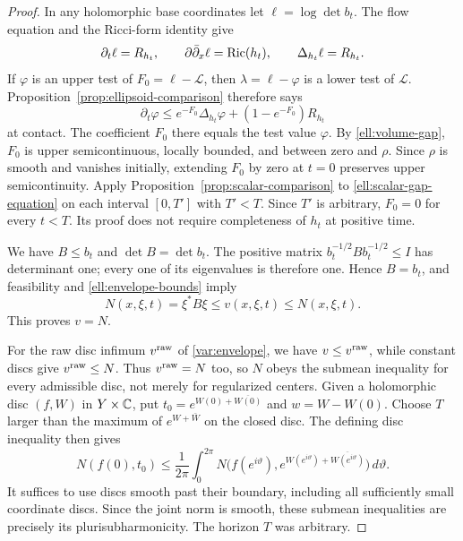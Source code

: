 \begin{proof}
In any holomorphic base coordinates let $\ell=\log\det b_t$.
The flow equation and the Ricci-form identity give
\[
 \partial_t\ell=R_{h_t},\qquad
 \partial\bar\partial_x\ell=\operatorname{Ric}(h_t),\qquad
 \Delta_{h_t}\ell=R_{h_t}.
\]
If $\varphi$ is an upper test of $F_0=\ell-\mathcal L$, then
$\lambda=\ell-\varphi$ is a lower test of $\mathcal L$.
Proposition~\ref{prop:ellipsoid-comparison} therefore says
\begin{equation}\label{ell:scalar-gap-equation}
 \partial_t\varphi
 \le e^{-F_0}\Delta_{h_t}\varphi
          +(1-e^{-F_0})R_{h_t}
\end{equation}
at contact.  The coefficient $F_0$ there equals the test value
$\varphi$.  By \eqref{ell:volume-gap}, $F_0$ is upper semicontinuous,
locally bounded, and between zero and $\rho$.  Since $\rho$ is smooth
and vanishes initially, extending $F_0$ by zero at $t=0$ preserves
upper semicontinuity.  Apply Proposition~\ref{prop:scalar-comparison}
to \eqref{ell:scalar-gap-equation} on each interval $[0,T']$ with
$T'<T$.  Since $T'$ is arbitrary, $F_0=0$ for every $t<T$.
Its proof does not require completeness of $h_t$ at positive time.

We have $B\le b_t$ and $\det B=\det b_t$.  The positive matrix
$b_t^{-1/2}Bb_t^{-1/2}\le I$ has determinant one; every one of its
eigenvalues is therefore one.  Hence $B=b_t$, and feasibility and
\eqref{ell:envelope-bounds} imply
\[
 N(x,\xi,t)=\xi^*B\xi\le v(x,\xi,t)\le N(x,\xi,t).
\]
This proves $v=N$.

For the raw disc infimum $v^{\rm raw}$ of \eqref{var:envelope},
we have $v\le v^{\rm raw}$, while constant discs give $v^{\rm raw}\le N$.
Thus $v^{\rm raw}=N$ too, so $N$ obeys the submean inequality for
every admissible disc, not merely for regularized centers.
Given a holomorphic disc $(f,W)$ in $Y\times\mathbb C$, put
$t_0=e^{W(0)+\overline{W(0)}}$ and $w=W-W(0)$.
Choose $T$ larger than the maximum of $e^{W+\bar W}$ on the closed
disc.  The defining disc inequality then gives
\[
 N(f(0),t_0)
 \le\frac1{2\pi}\int_0^{2\pi}
 N\bigl(f(e^{i\vartheta}),e^{W(e^{i\vartheta})+
                  \overline{W(e^{i\vartheta})}}\bigr)\,d\vartheta.
\]
It suffices to use discs smooth past their boundary, including all
sufficiently small coordinate discs.  Since the joint norm is smooth,
these submean inequalities are precisely its plurisubharmonicity.
The horizon $T$ was arbitrary.
\end{proof}
